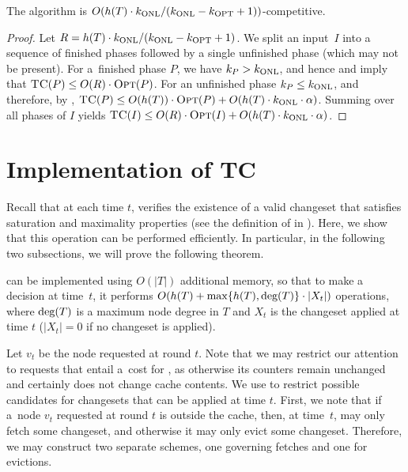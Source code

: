 \begin{theorem}
The algorithm \ALGTC is $O(h(T) \cdot k_\textnormal{ONL}/(k_\textnormal{ONL}-k_\textnormal{OPT}+1))$-competitive.
\end{theorem}

\begin{proof}
Let $R = h(T) \cdot k_\textnormal{ONL}/(k_\textnormal{ONL}-k_\textnormal{OPT}+1)$. We split an input~$I$ into a
sequence of finished phases followed by a single unfinished phase (which may
not be present). For a~finished phase $P$, we have $k_P > k_\textnormal{ONL}$, and hence
 and 
imply that $\textsc{TC}(P) \leq O(R) \cdot \textsc{Opt}(P)$. For an unfinished phase $k_P
\leq k_\textnormal{ONL}$, and therefore, by , $\textsc{TC}(P)
\leq O(h(T)) \cdot \textsc{Opt}(P) + O(h(T) \cdot k_\textnormal{ONL} \cdot \alpha)$. Summing over
all phases of $I$ yields $\textsc{TC}(I) \leq O(R) \cdot \textsc{Opt}(I) + O(h(T) \cdot k_\textnormal{ONL}
\cdot \alpha)$.
\end{proof}



\section{Implementation of TC}\label{sec:implementing_counters}

Recall that at each time $t$, \ALGTC verifies the existence of a valid changeset
that satisfies saturation and maximality properties (see the definition of
\ALGTC in ). Here, we show that this operation can be
performed efficiently. In particular, in the following two subsections, we
will prove the following theorem.

\begin{theorem}
\ALGTC can be implemented using $O(|T|)$ additional memory, so that to make a
decision at time~$t$, it performs $O(h(T) + \max \{ h(T), \textrm{deg}(T) \} \cdot |X_t|)$ operations,
where $\textrm{deg}(T)$ is a maximum node degree in $T$ and 
$X_t$ is the changeset applied at time $t$ ($|X_t| = 0$ if no changeset is
applied). 
\end{theorem}


Let $v_t$ be the node requested at round $t$. Note that we may restrict our
attention to requests that entail a~cost for \ALGTC, as otherwise its counters
remain unchanged and certainly \ALGTC does not change cache contents. We use
 to restrict possible candidates
for changesets that can be applied at time $t$. First, we note that if a~node
$v_t$ requested at round $t$ is outside the cache, then, at time~$t$, \ALGTC may
only fetch some changeset, and otherwise it may only evict some changeset.
Therefore, we may construct two separate schemes, one governing fetches and
one for evictions.

